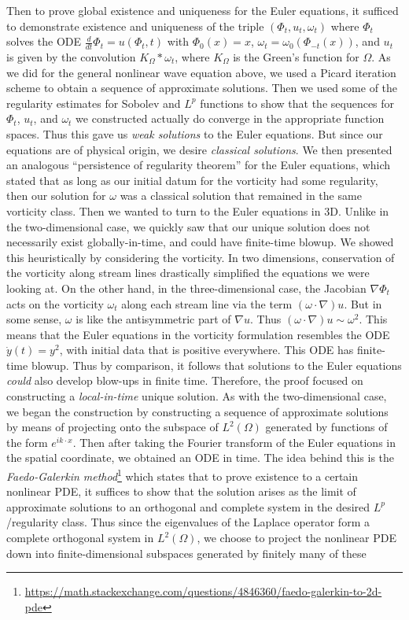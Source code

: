 \documentclass{article}
\begin{document}
	Then to prove global existence and uniqueness for the Euler equations, it sufficed to demonstrate existence and uniqueness of the triple $(\Phi_{t}, u_{t}, \omega_{t})$ where $\Phi_{t}$ solves the ODE $\frac{d}{dt}\Phi_{t} = u(\Phi_{t}, t)$ with $\Phi_{0}(x) = x$, $\omega_{t} = \omega_{0}(\Phi_{-t}(x))$, and $u_{t}$ is given by the convolution $K_{\Omega} \ast \omega_{t}$, where $K_{\Omega}$ is the Green's function for $\Omega$. As we did for the general nonlinear wave equation above, we used a Picard iteration scheme to obtain a sequence of approximate solutions. Then we used some of the regularity estimates for Sobolev and $L^{p}$ functions to show that the sequences for $\Phi_{t}$, $u_{t}$, and $\omega_{t}$ we constructed actually do converge in the appropriate function spaces. Thus this gave us \textit{weak solutions} to the Euler equations. But since our equations are of physical origin, we desire \textit{classical solutions}. We then presented an analogous ``persistence of regularity theorem'' for the Euler equations, which stated that as long as our initial datum for the vorticity had some regularity, then our solution for $\omega$ was a classical solution that remained in the same vorticity class. Then we wanted to turn to the Euler equations in 3D. Unlike in the two-dimensional case, we quickly saw that our unique solution does not necessarily exist globally-in-time, and could have finite-time blowup. We showed this heuristically by considering the vorticity. In two dimensions, conservation of the vorticity along stream lines drastically simplified the equations we were looking at. On the other hand, in the three-dimensional case, the Jacobian $\nabla \Phi_{t}$ acts on the vorticity $\omega_{t}$ along each stream line via the term $(\omega \cdot \nabla)u$. But in some sense, $\omega$ is like the antisymmetric part of $\nabla u$. Thus $(\omega \cdot \nabla) u \sim \omega^{2}$. This means that the Euler equations in the vorticity formulation resembles the ODE $\dot{y}(t) = y^{2}$, with initial data that is positive everywhere. This ODE has finite-time blowup. Thus by comparison, it follows that solutions to the Euler equations \textit{could} also develop blow-ups in finite time. Therefore, the proof focused on constructing a \textit{local-in-time} unique solution. As with the two-dimensional case, we began the construction by constructing a sequence of approximate solutions by means of projecting onto the subspace of $L^{2}(\Omega)$ generated by functions of the form $e^{ik \cdot x}$. Then after taking the Fourier transform of the Euler equations in the spatial coordinate, we obtained an ODE in time. The idea behind this is the \textit{Faedo-Galerkin method}\footnote{\href{https://math.stackexchange.com/questions/4846360/faedo-galerkin-to-2d-pde}{https://math.stackexchange.com/questions/4846360/faedo-galerkin-to-2d-pde}} which states that to prove existence to a certain nonlinear PDE, it suffices to show that the solution arises as the limit of approximate solutions to an orthogonal and complete system in the desired $L^{p}$/regularity class. Thus since the eigenvalues of the Laplace operator form a complete orthogonal system in $L^{2}(\Omega)$, we choose to project the nonlinear PDE down into finite-dimensional subspaces generated by finitely many of these 
\end{document}
